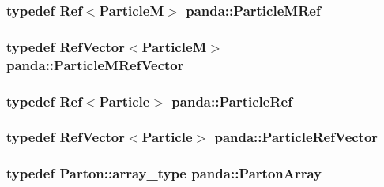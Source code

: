 \label{namespacepanda_a1e461f36eeeecf119695e60acf10dbb6}
\hypertarget{namespacepanda_a9ab300b299e3fdfb685cb0aae4925e99}{
\subsubsection[{ParticleMRef}]{\setlength{\rightskip}{0pt plus 5cm}typedef {\bf Ref}$<${\bf ParticleM}$>$ {\bf panda::ParticleMRef}}}
\label{namespacepanda_a9ab300b299e3fdfb685cb0aae4925e99}
\hypertarget{namespacepanda_ab752f2f6e8cc21c37d67ed552500b70a}{
\subsubsection[{ParticleMRefVector}]{\setlength{\rightskip}{0pt plus 5cm}typedef {\bf RefVector}$<${\bf ParticleM}$>$ {\bf panda::ParticleMRefVector}}}
\label{namespacepanda_ab752f2f6e8cc21c37d67ed552500b70a}
\hypertarget{namespacepanda_a23b96a64b998bcc29e3d6773dd68d0c5}{
\subsubsection[{ParticleRef}]{\setlength{\rightskip}{0pt plus 5cm}typedef {\bf Ref}$<${\bf Particle}$>$ {\bf panda::ParticleRef}}}
\label{namespacepanda_a23b96a64b998bcc29e3d6773dd68d0c5}
\hypertarget{namespacepanda_ab51d55a6dbee094ae15c5f00e7667693}{
\subsubsection[{ParticleRefVector}]{\setlength{\rightskip}{0pt plus 5cm}typedef {\bf RefVector}$<${\bf Particle}$>$ {\bf panda::ParticleRefVector}}}
\label{namespacepanda_ab51d55a6dbee094ae15c5f00e7667693}
\hypertarget{namespacepanda_a4b45a509f15ea6c03f31cfe3b60c649c}{
\subsubsection[{PartonArray}]{\setlength{\rightskip}{0pt plus 5cm}typedef {\bf Parton::array\_\-type} {\bf panda::PartonArray}}}
